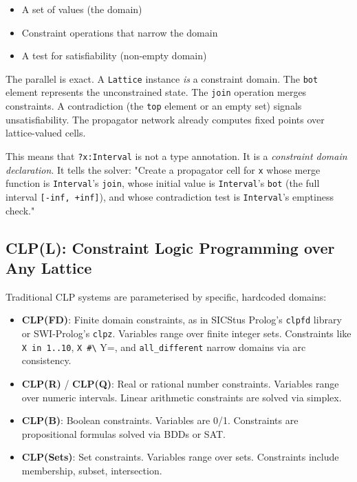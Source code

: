 \documentclass[11pt]{article}
\begin{document}
\begin{itemize}
\item A set of values (the domain)
\item Constraint operations that narrow the domain
\item A test for satisfiability (non-empty domain)
\end{itemize}

The parallel is exact. A \texttt{Lattice} instance \emph{is} a constraint domain. The
\texttt{bot} element represents the unconstrained state. The \texttt{join} operation merges
constraints. A contradiction (the \texttt{top} element or an empty set) signals
unsatisfiability. The propagator network already computes fixed points over
lattice-valued cells.

This means that \texttt{?x:Interval} is not a type annotation. It is a \emph{constraint
domain declaration}. It tells the solver: "Create a propagator cell for \texttt{x}
whose merge function is \texttt{Interval}'s \texttt{join}, whose initial value is
\texttt{Interval}'s \texttt{bot} (the full interval \texttt{[-inf, +inf]}), and whose contradiction
test is \texttt{Interval}'s emptiness check."
\subsection{CLP(L): Constraint Logic Programming over Any Lattice}
\label{sec:org693bfdc}

Traditional CLP systems are parameterised by specific, hardcoded domains:

\begin{itemize}
\item \textbf{CLP(FD)}: Finite domain constraints, as in SICStus Prolog's \texttt{clpfd} library
or SWI-Prolog's \texttt{clpz}. Variables range over finite integer sets. Constraints
like \texttt{X in 1..10}, \texttt{X \#\textbackslash{}} Y=, and \texttt{all\_different} narrow domains via arc
consistency.
\item \textbf{CLP(R)} / \textbf{CLP(Q)}: Real or rational number constraints. Variables range over
numeric intervals. Linear arithmetic constraints are solved via simplex.
\item \textbf{CLP(B)}: Boolean constraints. Variables are 0/1. Constraints are propositional
formulas solved via BDDs or SAT.
\item \textbf{CLP(Sets)}: Set constraints. Variables range over sets. Constraints include
membership, subset, intersection.
\end{itemize}
\end{document}
